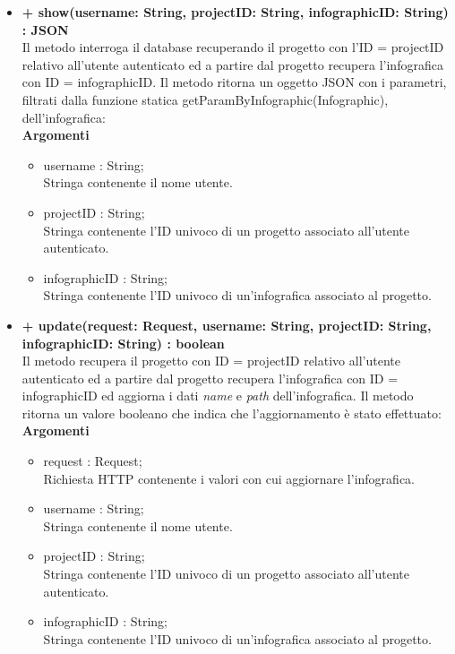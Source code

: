 \begin{itemize}
			\item \textbf{+ show(username: String, projectID: String, infographicID: String) : JSON}\\
			Il metodo interroga il \gls{database} recuperando il progetto con l'ID = projectID relativo all'utente autenticato ed a partire dal progetto recupera l'\gls{infografica} con ID = infographicID. Il metodo ritorna un oggetto \gls{JSON} con i parametri, filtrati dalla funzione statica getParamByInfographic(Infographic), dell'\gls{infografica}:\\
			\textbf{Argomenti}
			\begin{itemize}
				\item username : String; \\
				Stringa contenente il nome utente.
				\item projectID : String; \\
				Stringa contenente l'ID univoco di un progetto associato all'utente autenticato.
				\item infographicID : String; \\
				Stringa contenente l'ID univoco di un'\gls{infografica} associato al progetto.
			\end{itemize}
			
			\item \textbf{+ update(request: Request, username: String, projectID: String, infographicID: String) : boolean}\\
			Il metodo recupera il progetto con ID = projectID relativo all'utente autenticato ed a partire dal progetto recupera l'\gls{infografica} con ID = infographicID ed aggiorna i dati \textit{name} e \textit{path} dell'\gls{infografica}. Il metodo ritorna un valore booleano che indica che l'aggiornamento è stato effettuato:\\
			\textbf{Argomenti}
			\begin{itemize}
				\item request : Request;\\
				Richiesta HTTP contenente i valori con cui aggiornare l'\gls{infografica}.
				\item username : String; \\
				Stringa contenente il nome utente.
				\item projectID : String; \\
				Stringa contenente l'ID univoco di un progetto associato all'utente autenticato.
				\item infographicID : String; \\
				Stringa contenente l'ID univoco di un'\gls{infografica} associato al progetto.
			\end{itemize}
			

\end{itemize}
